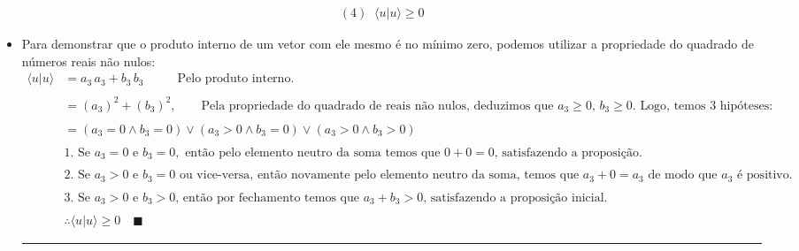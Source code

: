 \documentclass[
]{article}
\begin{document}
\begin{itemize}
  \[
  \begin{flalign*}
  (4)\;\;\langle u|u\rangle\geq0&&
  \end{flalign*}
  \]
\item
  Para demonstrar que o produto interno de um vetor com ele mesmo é no
  mínimo zero, podemos utilizar a propriedade do quadrado de números
  reais não nulos:\[
    \begin{flalign*}
    \langle u|u\rangle&=a_3\,a_3+b_3\,b_3\qquad\;\,\;\text{Pelo produto interno.}&& \\ \\
    &=(a_3)^2+(b_3)^2,\qquad\text{Pela propriedade do quadrado de reais não nulos, deduzimos que }a_3\geq0,\,b_3\geq0.\text{ Logo, temos $3$ hipóteses:}&& \\ \\
    &=(a_3=0\wedge b_3=0)\vee(a_3>0\wedge b_3=0)\vee(a_3>0\wedge b_3>0)&& \\ \\
    &\text{1. Se }a_3=0\text{ e }b_3=0,\text{ então pelo elemento neutro da soma temos que }0+0=0\text{, satisfazendo a proposição.}&& \\ \\
    &\text{2. Se }a_3>0\text{ e }b_3=0\text{ ou vice-versa, então novamente pelo elemento neutro da soma, temos que }a_3+0=a_3\text{ de modo que $a_3$ é positivo.}& \\ \\
    &\text{3. Se $a_3>0$ e $b_3>0$, então por fechamento temos que $a_3+b_3>0$, satisfazendo a proposição inicial.}&& \\ \\
    &\therefore\langle u|u\rangle\geq0\quad\blacksquare&&
    \end{flalign*}
    \]

  \begin{center}\rule{0.5\linewidth}{0.5pt}\end{center}


\end{itemize}
\end{document}
